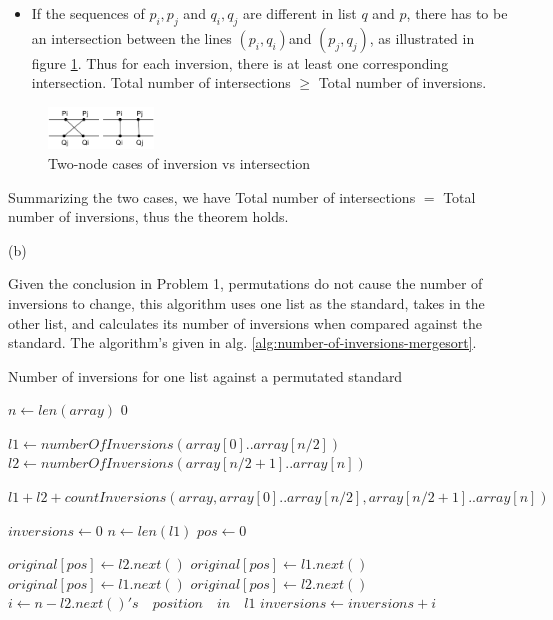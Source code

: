 \documentclass{article}
\begin{document}
\begin{description}
\begin{itemize}
  \item
  If the sequences of $p_i, p_j$ and $q_i, q_j$ are different in list $q$ and $p$, there has to be an intersection between the lines $(p_i, q_i)$and $(p_j, q_j)$, as illustrated in figure \ref{fig:pb2}. Thus for each inversion, there is at least one corresponding intersection. Total number of intersections $\geq$ Total number of inversions.

  \end{itemize}

  \begin{figure}[h]
  \centering
  \includegraphics[width=0.25\textwidth]{pb2}
  \caption{Two-node cases of inversion vs intersection}
  \label{fig:pb2}
  \end{figure}

  Summarizing the two cases, we have Total number of intersections $ = $ Total number of inversions, thus the theorem holds. 

  (b)

  Given the conclusion in Problem 1, permutations do not cause the number of inversions to change, this algorithm uses one list as the standard, takes in the other list, and calculates its number of inversions when compared against the standard. The algorithm's given in alg. \ref{alg:number-of-inversions-mergesort}.
  
  \begin{algorithm}[h]
  \caption{Number of inversions for one list against a permutated standard}
  \label{alg:number-of-inversions-mergesort}
    \begin{algorithmic}[1]
      \State $n \gets len(array)$
        \State \Return $0$
      \EndIf
      
      \State $l1 \gets numberOfInversions(array[0]..array[n/2])$
      \State $l2 \gets numberOfInversions(array[n/2+1]..array[n])$

      \State \Return $l1 + l2 + countInversions(array, array[0]..array[n/2], array[n/2+1]..array[n])$
    \EndFunction

      \State $inversions \gets 0$
      \State $n \gets len(l1)$
      \State $pos \gets 0$

          \State $original[pos] \gets l2.next()$
          \State $original[pos] \gets l1.next()$
          \State $original[pos] \gets l1.next()$
        \Else
          \State $original[pos] \gets l2.next()$
          \State $i \gets n - l2.next()'s \quad position \quad in \quad l1$
          \State $inversions \gets inversions + i$
        \EndIf
        

\end{algorithmic}
\end{algorithm}
\end{description}
\end{document}
